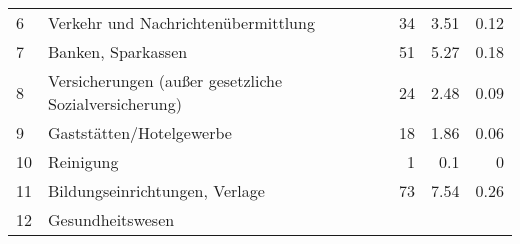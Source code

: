 \begin{longtable}{lXrrr}
     6 &
     \multicolumn{1}{X}{ Verkehr und Nachrichtenübermittlung   } &


       \num{34} &
       \num[round-mode=places,round-precision=2]{3.51} &
         \num[round-mode=places,round-precision=2]{0.12} \\

     7 &
     \multicolumn{1}{X}{ Banken, Sparkassen   } &


       \num{51} &
       \num[round-mode=places,round-precision=2]{5.27} &
         \num[round-mode=places,round-precision=2]{0.18} \\

     8 &
     \multicolumn{1}{X}{ Versicherungen (außer gesetzliche Sozialversicherung)   } &


       \num{24} &
       \num[round-mode=places,round-precision=2]{2.48} &
         \num[round-mode=places,round-precision=2]{0.09} \\

     9 &
     \multicolumn{1}{X}{ Gaststätten/Hotelgewerbe   } &


       \num{18} &
       \num[round-mode=places,round-precision=2]{1.86} &
         \num[round-mode=places,round-precision=2]{0.06} \\

     10 &
     \multicolumn{1}{X}{ Reinigung   } &


       \num{1} &
       \num[round-mode=places,round-precision=2]{0.1} &
         \num[round-mode=places,round-precision=2]{0} \\

     11 &
     \multicolumn{1}{X}{ Bildungseinrichtungen, Verlage   } &


       \num{73} &
       \num[round-mode=places,round-precision=2]{7.54} &
         \num[round-mode=places,round-precision=2]{0.26} \\

     12 &
     \multicolumn{1}{X}{ Gesundheitswesen   } &



\end{longtable}
